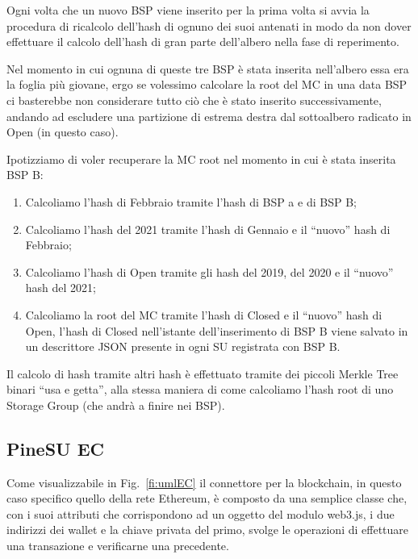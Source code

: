 Ogni volta che un nuovo BSP viene inserito per la prima volta si avvia la procedura di
ricalcolo dell’hash di ognuno dei suoi antenati in modo da non dover effettuare il calcolo
dell’hash di gran parte dell’albero nella fase di reperimento.

Nel momento in cui ognuna di queste tre BSP è stata inserita nell’albero essa era la foglia più
giovane, ergo se volessimo calcolare la root del MC in una data BSP ci basterebbe non
considerare tutto ciò che è stato inserito successivamente, andando ad escludere una
partizione di estrema destra dal sottoalbero radicato in Open (in questo caso).

\newpage

Ipotizziamo di voler recuperare la MC root nel momento in cui è stata inserita BSP B:
\begin{enumerate}
    \item Calcoliamo l’hash di Febbraio tramite l’hash di BSP a e di BSP B;
    \item Calcoliamo l’hash del 2021 tramite l’hash di Gennaio e il “nuovo” hash di Febbraio;
    \item Calcoliamo l’hash di Open tramite gli hash del 2019, del 2020 e il “nuovo” hash del 2021;
    \item Calcoliamo la root del MC tramite l’hash di Closed e il “nuovo” hash di Open, l’hash di Closed nell’istante dell’inserimento di BSP B viene salvato in un descrittore JSON presente in ogni SU registrata con BSP B.
\end{enumerate}
Il calcolo di hash tramite altri hash è effettuato tramite dei piccoli Merkle Tree binari “usa e getta”, alla stessa maniera di come calcoliamo l’hash root di uno Storage Group (che andrà a finire nei BSP).

\subsection{PineSU EC}

Come visualizzabile in Fig.~\ref{fi:umlEC} il connettore per la blockchain, in questo caso specifico quello della rete Ethereum, è composto da una semplice classe che, con i suoi attributi che corrispondono ad un oggetto del modulo \textsf{web3.js}, i due indirizzi dei wallet e la chiave privata del primo, svolge le operazioni di effettuare una transazione e verificarne una precedente.

